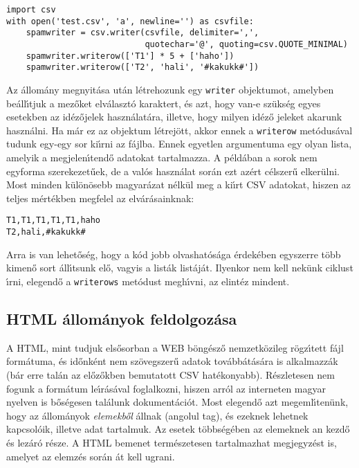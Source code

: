 \begin{Verbatim}[fontsize=\small]
import csv
with open('test.csv', 'a', newline='') as csvfile:
    spamwriter = csv.writer(csvfile, delimiter=',',
                            quotechar='@', quoting=csv.QUOTE_MINIMAL)
    spamwriter.writerow(['T1'] * 5 + ['haho'])
    spamwriter.writerow(['T2', 'hali', '#kakukk#'])
\end{Verbatim}

\noindent Az \'allom\'any megnyit\'asa ut\'an l\'etrehozunk egy {\tt writer} objektumot, amelyben 
be\'all\'{\i}tjuk a mez\H{o}ket elv\'alaszt\'o karaktert, \'es azt, hogy van-e sz\"uks\'eg 
egyes esetekben az id\'ez\H{o}jelek haszn\'alat\'ara, illetve, hogy milyen id\'ez\H{o} jeleket 
akarunk haszn\'alni. Ha m\'ar ez az objektum l\'etrej\"ott, akkor ennek a {\tt writerow} 
met\'odus\'aval tudunk egy-egy sor ki\'{\i}rni az f\'ajlba. Ennek egyetlen argumentuma egy 
olyan lista, amelyik a megjelen\'{\i}tend\H{o} adatokat tartalmazza. A p\'eld\'aban a sorok 
nem egyforma szerekezet\H{u}ek, de a val\'os haszn\'alat sor\'an ezt az\'ert c\'elszer\H{u} 
elker\"ulni. Most minden k\"ul\"on\"osebb magyar\'azat n\'elk\"ul meg a ki\'{\i}rt CSV adatokat, 
hiszen az teljes m\'ert\'ekben megfelel az elv\'ar\'asainknak:

\begin{Verbatim}[fontsize=\small]
T1,T1,T1,T1,T1,haho
T2,hali,#kakukk#
\end{Verbatim}

\noindent Arra is van lehet\H{o}s\'eg, hogy a k\'od jobb olvashat\'os\'aga \'erdek\'eben egyszerre 
t\"obb kimen\H{o} sort \'all\'{\i}tsunk el\H{o}, vagyis a list\'ak list\'aj\'at. Ilyenkor nem kell 
nek\"unk ciklust \'{\i}rni, elegend\H{o} a {\tt writerows} met\'odust megh\'{\i}vni, az elint\'ez mindent. 

\subsection{HTML \'allom\'anyok feldolgoz\'asa}

A HTML, mint tudjuk els\H{o}sorban a WEB b\"ong\'esz\H{o} nemzetk\"ozileg r\"ogz\'{\i}tett f\'ajl 
form\'atuma, \'es id\H{o}nk\'ent nem sz\"ovegszer\H{u} adatok tov\'abb\'at\'as\'ara is alkalmazz\'ak 
(b\'ar erre tal\'an az el\H{o}z\H{o}kben bemutatott CSV hat\'ekonyabb).  R\'eszletesen nem fogunk a 
form\'atum le\'{\i}r\'as\'aval foglalkozni, hiszen arr\'ol az interneten magyar nyelven is b\H{o}s\'egesen 
tal\'alunk dokument\'aci\'ot. Most elegend\H{o} azt megeml\'{\i}ten\"unk, hogy az \'allom\'anyok 
{\sl elemekb\H{o}l} \'allnak (angolul tag), \'es ezeknek lehetnek kapcsol\'oik, illetve adat tartalmuk. 
Az esetek t\"obbs\'eg\'eben az elemeknek an kezd\H{o} \'es lez\'ar\'o r\'esze. A HTML bemenet term\'eszetesen 
tartalmazhat megjegyz\'est is, amelyet az elemz\'es sor\'an \'at kell ugrani.

